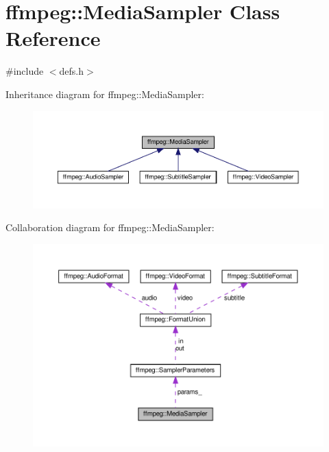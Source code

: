 \hypertarget{classffmpeg_1_1MediaSampler}{}\section{ffmpeg\+:\+:Media\+Sampler Class Reference}
\label{classffmpeg_1_1MediaSampler}


{\ttfamily \#include $<$defs.\+h$>$}



Inheritance diagram for ffmpeg\+:\+:Media\+Sampler\+:
\nopagebreak
\begin{figure}[H]
\begin{center}
\leavevmode
\includegraphics[width=350pt]{classffmpeg_1_1MediaSampler__inherit__graph}
\end{center}
\end{figure}


Collaboration diagram for ffmpeg\+:\+:Media\+Sampler\+:
\nopagebreak
\begin{figure}[H]
\begin{center}
\leavevmode
\includegraphics[width=350pt]{classffmpeg_1_1MediaSampler__coll__graph}
\end{center}
\end{figure}
